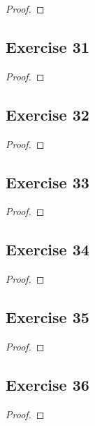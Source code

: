 \documentclass[14pt]{extarticle}
\begin{document}
\begin{proof}

\end{proof}

\subsection{Exercise 31}

\begin{proof}

\end{proof}

\subsection{Exercise 32}

\begin{proof}

\end{proof}

\subsection{Exercise 33}

\begin{proof}

\end{proof}

\subsection{Exercise 34}

\begin{proof}

\end{proof}

\subsection{Exercise 35}

\begin{proof}

\end{proof}

\subsection{Exercise 36}

\begin{proof}

\end{proof}
\end{document}
